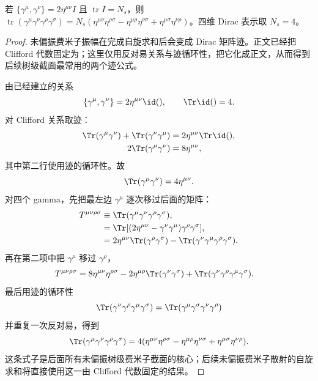 \begin{lemma}
若 $\{\gamma^\mu,\gamma^\nu\}=2\eta^{\mu\nu}I$ 且 $\operatorname{tr}I=N_s$，则 $\operatorname{tr}(\gamma^\mu\gamma^\nu\gamma^\rho\gamma^\sigma)=N_s(\eta^{\mu\nu}\eta^{\rho\sigma}-\eta^{\mu\rho}\eta^{\nu\sigma}+\eta^{\mu\sigma}\eta^{\nu\rho})$。四维 Dirac 表示取 $N_s=4$。
\end{lemma}
\begin{proof}
未偏振费米子振幅在完成自旋求和后会变成 Dirac 矩阵迹。正文已经把 Clifford 代数固定为；这里仅用反对易关系与迹循环性，把它化成正文，从而得到后续树级截面最常用的两个迹公式。



由已经建立的关系
\begin{equation*}
 \{\gamma^\mu,\gamma^\nu\}=2\eta^{\mu\nu}\id(),
 \qquad
 \Tr\id()=4.
\end{equation*}
对 Clifford 关系取迹：
\begin{align*}
 \Tr(\gamma^\mu\gamma^\nu)
 +\Tr(\gamma^\nu\gamma^\mu)
 &=2\eta^{\mu\nu}\Tr\id(),\\
 2\Tr(\gamma^\mu\gamma^\nu)
 &=8\eta^{\mu\nu},
\end{align*}
其中第二行使用迹的循环性。故
\begin{equation*}
 {\Tr(\gamma^\mu\gamma^\nu)=4\eta^{\mu\nu}.}
 \end{equation*}
对四个 gamma，先把最左边 $\gamma^\mu$ 逐次移过后面的矩阵：
\begin{align*}
 T^{\mu\nu\rho\sigma}
 &\equiv\Tr(\gamma^\mu\gamma^\nu\gamma^\rho\gamma^\sigma),\\
 &=\Tr[(2\eta^{\mu\nu}-\gamma^\nu\gamma^\mu)
 \gamma^\rho\gamma^\sigma],\\
 &=2\eta^{\mu\nu}\Tr(\gamma^\rho\gamma^\sigma)
 -\Tr(\gamma^\nu\gamma^\mu\gamma^\rho\gamma^\sigma).
\end{align*}
再在第二项中把 $\gamma^\mu$ 移过 $\gamma^\rho$，
\begin{align*}
 T^{\mu\nu\rho\sigma}
 &=8\eta^{\mu\nu}\eta^{\rho\sigma}
 -2\eta^{\mu\rho}\Tr(\gamma^\nu\gamma^\sigma)
 +\Tr(\gamma^\nu\gamma^\rho\gamma^\mu\gamma^\sigma).
\end{align*}
最后用迹的循环性
\begin{equation*}
 \Tr(\gamma^\nu\gamma^\rho\gamma^\mu\gamma^\sigma)
 =\Tr(\gamma^\mu\gamma^\sigma\gamma^\nu\gamma^\rho)
\end{equation*}
并重复一次反对易，得到
\begin{equation*}
 {
 \Tr(\gamma^\mu\gamma^\nu\gamma^\rho\gamma^\sigma)
 =4(\eta^{\mu\nu}\eta^{\rho\sigma}
 -\eta^{\mu\rho}\eta^{\nu\sigma}
 +\eta^{\mu\sigma}\eta^{\nu\rho}).}
 \end{equation*}
这条式子是后面所有未偏振树级费米子截面的核心；后续未偏振费米子散射的自旋求和将直接使用这一由 Clifford 代数固定的结果。
\end{proof}

